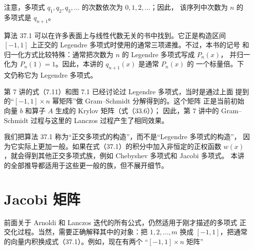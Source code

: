 \documentclass[UTF8,fontset=none,12pt]{ctexart}
\begin{document}
\begin{center}
\end{center}

注意，多项式 $q_1,q_2,q_3,\ldots$ 的次数依次为 $0,1,2,\ldots$；因此，
该序列中次数为 $n$ 的多项式是 $q_{n+1}$。

算法 37.1 可以在许多表面上与线性代数无关的书中找到。它正是构造区间
$[-1,1]$ 上正交的 Legendre 多项式时使用的通常三项递推。不过，本书的记号
和归一化方式比较特殊：通常把次数为 $n$ 的 Legendre 多项式写成 $P_n(x)$，
并归一化为 $P_n(1)=1$。因此，本讲的 $q_{n+1}(x)$ 是通常 $P_n(x)$ 的
一个标量倍。下文仍称它为 Legendre 多项式。

第 7 讲的式（7.11）和图 7.1 已经讨论过 Legendre 多项式，当时是通过上面
提到的“$[-1,1]\times n$ 幂矩阵”做 Gram--Schmidt 分解得到的。这个矩阵
正是当前初始向量 $b$ 和算子 $A$ 生成的 Krylov 矩阵（式（33.6））；
因此，第 7 讲中的 Gram--Schmidt 过程与这里的 Lanczos 过程产生了相同效果。

我们把算法 37.1 称为“正交多项式的构造”，而不是“Legendre 多项式的构造”，
因为它实际上更加一般。如果在式（37.1）的积分中加入非恒定的正权函数
$w(x)$，就会得到其他正交多项式族，例如 Chebyshev 多项式和 Jacobi 多项式。
本讲的全部推导都适用于这些更一般的族，但不展开细节。

\section*{Jacobi 矩阵}

前面关于 Arnoldi 和 Lanczos 迭代的所有公式，仍然适用于刚才描述的多项式
正交化过程。当然，需要正确解释其中的对象：把 $1,2,\ldots,m$ 换成
$[-1,1]$，把通常的向量内积换成式（37.1）。例如，现在有两个
“$[-1,1]\times n$ 矩阵”
\end{document}
